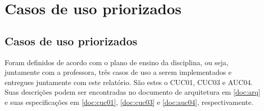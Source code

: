\part{Casos de uso priorizados}
\chapter[Casos de uso priorizados]{Casos de uso priorizados}

Foram definidos de acordo com o plano de ensino da disciplina, ou seja, juntamente com a professora, três casos de uso a serem implementados e entregues juntamente com este relatório. São estes o CUC01, CUC03 e AUC04. Suas descrições podem ser encontradas no documento de arquitetura em \ref{doc:arq} e suas especificações em \ref{doc:cuc01}, \ref{doc:cuc03} e \ref{doc:auc04}, respectivamente.
